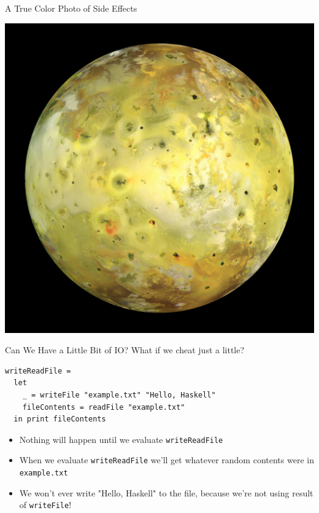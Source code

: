 \documentclass[10pt, presentation, colorlinks]{beamer}
\begin{document}
\begin{frame}[label={sec:orgce2dd21}]{A True Color Photo of Side Effects}
\begin{center}
\includegraphics[height=0.6\textheight]{./img/io.jpg}
\end{center}
\end{frame}

\begin{frame}[label={sec:org4dbdfa6},fragile]{Can We Have a Little Bit of IO?}
 What if we cheat just a little?

\bigskip
\pause

\begin{verbatim}
writeReadFile =
  let
    _ = writeFile "example.txt" "Hello, Haskell"
    fileContents = readFile "example.txt"
  in print fileContents
\end{verbatim}

\bigskip

\pause
\begin{itemize}
\item Nothing will happen until we evaluate \texttt{writeReadFile}
\end{itemize}
\pause
\begin{itemize}
\item When we evaluate \texttt{writeReadFile} we'll get whatever random contents were in \texttt{example.txt}
\end{itemize}
\pause
\begin{itemize}
\item We won't ever write \alert{"Hello, Haskell"} to the file, because we're not using result of \texttt{writeFile}!
\end{itemize}
\end{frame}
\end{document}
